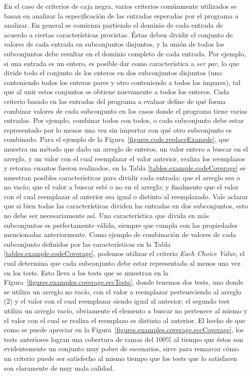 En el caso de criterios de caja negra, varios criterios com\'unmente utilizados se basan en analizar la especificaci\'on de las entradas esperadas por el programa a analizar. En general se comienza partiendo el dominio de cada entrada de acuerdo a ciertas caracter\'isticas provistas. \'Estas deben dividir el conjunto de valores de cada entrada en subconjuntos disjuntos, y la uni\'on de todos los subconjuntos debe resultar en el dominio completo de cada entrada. Por ejemplo, si una entrada es un entero, es posible dar como caracter\'istica a \emph{ser par}, lo que divide todo el conjunto de los enteros en dos subconjuntos disjuntos (uno conteniendo todos los enteros pares y otro conteniendo a todos los impares), tal que al unir estos conjuntos se obtiene nuevamente a todos los enteros. Cada criterio basado en las entradas del programa a evaluar define de qu\'e forma combinar valores de cada subconjunto en los casos donde el programa tiene varias entradas. Por ejemplo, combinar todos con todos, o cada subconjunto debe estar representado por lo menos una vez sin importar con qu\'e otro subconjunto es combinado. Para el ejemplo de la Figura~\ref{figures.code.replaceExample}, que muestra un m\'etodo que dado un arreglo de enteros, un valor entero a buscar en el arreglo, y un valor con el cual reemplazar el valor anterior, realiza los reemplazos y retorna cuantos fueron realizados, en la Tabla \ref{tables.example.codeCoverage} se muestran posibles caracter\'isticas para dividir cada entrada: que el arreglo sea o no vac\'io; que el valor a buscar est\'e o no en el arreglo; y finalmente que el valor con el cual reemplazar al anterior sea igual o distinto al reemplazado. Vale aclarar que si bien todas las caracter\'isticas dividen las entradas en dos subconjuntos, esto no debe ser necesariamente as\'i. Una caracter\'istica que divida en m\'as subconjuntos es perfectamente v\'alida, siempre que cumpla con las propiedades mencionadas anteriormente. Como ejemplo de combinaci\'on de valores de cada subconjunto definidos por las caracter\'isticas en la Tabla \ref{tables.example.codeCoverage}, podemos utilizar el criterio \emph{Each Choice Value}, el cual determina que cada subconjunto debe estar representado al menos una vez en los tests. Esto lleva a los tests que se muestran en la Figura~\ref{figures.examples.coverage.eccTests}, donde tenemos dos tests, uno donde se utiliza un arreglo no vac\'io, con el valor a reemplazar perteneciendo al arreglo (2) y el valor con el cual reemplazar siendo igual al anterior; el segundo test utiliza un arreglo vac\'io, obviamente el elemento a buscar no pertenece al mismo y el valor con el cual se realiza el reemplazo es distinto al anterior. El hecho de que como se puede apreciar en la Figura~\ref{figures.examples.coverage.eccCoverage}, los tests anteriores logran una cobertura de ramas del 100\% al tiempo que \'estos son evidentemente un conjunto muy pobre de escenarios, sirve para remarcar c\'omo un criterio puede ser satisfecho al mismo tiempo que los tests que lo satisfacen son claramente de muy mala calidad.

